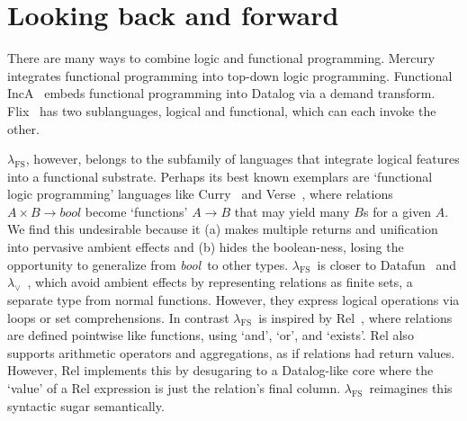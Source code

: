 \documentclass[runningheads]{llncs}
\newcommand\strong[1]{{\bfseries#1}}
\newcommand\todo[1]{{\color{IndianRed}#1}}
\newcommand\xxx{\text{\todo{\strong{XXX}}}}
\renewcommand\todo[1]{\ignorespaces}\renewcommand\xxx{\text{\color{IndianRed}\strong{XXX}}}
\newcommand\fslang{\ensuremath{\lambda_{\mathrm{FS}}}}
\newcommand\name[1]{\ensuremath{\mathit{#1}}}
\newcommand\<\:                 %
\newcommand\typename\textit
\newcommand\bool{\typename{bool}}
\begin{document}


\section{Looking back and forward}

There are many ways to combine logic and functional programming.
Mercury~\cite{DBLP:journals/jlp/SomogyiHC96} integrates
functional programming into top-down logic programming.
Functional IncA~\cite{DBLP:conf/ecoop/PacakE22} embeds functional programming into Datalog via a demand transform.
Flix~\cite{10.1145/3428193} has two sublanguages, logical and functional, which can each invoke the other.

\fslang, however, belongs to the subfamily of languages that integrate logical features into a functional substrate.
%
Perhaps its best known exemplars are `functional logic programming' languages like Curry~\cite{curry} and Verse~\cite{DBLP:journals/pacmpl/AugustssonBCJJSSS23}, %
where relations $A \times B \to \bool$ become `functions' $A \to B$ that may yield many $B$s for a given $A$.
%
We find this undesirable because it (a) makes multiple returns and unification into pervasive ambient effects and (b) hides the boolean-ness, losing the opportunity to generalize from \bool\ to other types.
\fslang\ is closer to Datafun~\cite{datafun} and $\lambda_\vee$~\cite{DBLP:journals/pacmpl/RiouxZ25}, which avoid ambient effects by representing relations as finite sets, a separate type from normal functions.
However, they express logical operations via loops or set comprehensions.
In contrast \fslang\ is inspired by %
Rel~\cite{10.1145/3722212.3724450},
where relations are defined pointwise like functions,
using `and', `or', and `exists'.
Rel also supports arithmetic operators and aggregations, as if relations had return values.
However, Rel implements this by desugaring to a Datalog-like core where the `value' of a Rel expression is just the relation's final column.
\fslang\ reimagines this syntactic sugar semantically.
\end{document}
